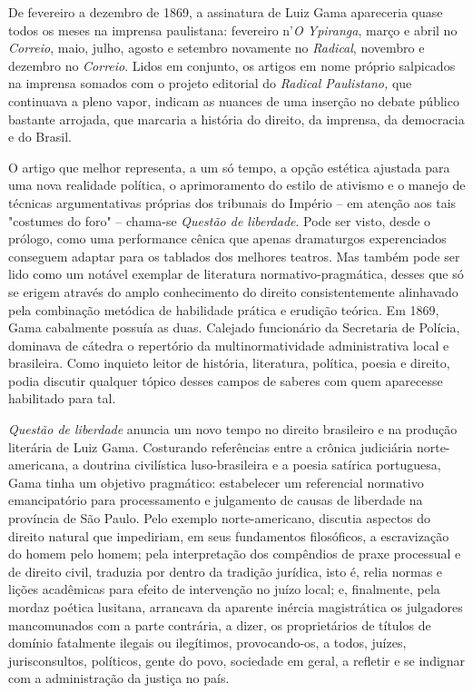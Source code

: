 De fevereiro a dezembro de 1869, a assinatura de Luiz Gama apareceria
quase todos os meses na imprensa paulistana: fevereiro n'\emph{O
Ypiranga}, março e abril no \emph{Correio}, maio, julho, agosto e
setembro novamente no \emph{Radical}, novembro e dezembro no
\emph{Correio}. Lidos em conjunto, os artigos em nome próprio salpicados
na imprensa somados com o projeto editorial do \emph{Radical
Paulistano,} que continuava a pleno vapor, indicam as nuances de uma
inserção no debate público bastante arrojada, que marcaria a história do
direito, da imprensa, da democracia e do Brasil.

O artigo que melhor representa, a um só tempo, a opção estética ajustada
para uma nova realidade política, o aprimoramento do estilo de ativismo
e o manejo de técnicas argumentativas próprias dos tribunais do Império
-- em atenção aos tais "costumes do foro" -- chama-se \emph{Questão de
liberdade}. Pode ser visto, desde o prólogo, como uma performance cênica
que apenas dramaturgos experenciados conseguem adaptar para os tablados
dos melhores teatros. Mas também pode ser lido como um notável exemplar
de literatura normativo-pragmática, desses que só se erigem através do
amplo conhecimento do direito consistentemente alinhavado pela
combinação metódica de habilidade prática e erudição teórica. Em 1869,
Gama cabalmente possuía as duas. Calejado funcionário da Secretaria de
Polícia, dominava de cátedra o repertório da multinormatividade
administrativa local e brasileira. Como inquieto leitor de história,
literatura, política, poesia e direito, podia discutir qualquer tópico
desses campos de saberes com quem aparecesse habilitado para tal.

\emph{Questão de liberdade} anuncia um novo tempo no direito brasileiro
e na produção literária de Luiz Gama. Costurando referências entre a
crônica judiciária norte-americana, a doutrina civilística
luso-brasileira e a poesia satírica portuguesa, Gama tinha um objetivo
pragmático: estabelecer um referencial normativo emancipatório para
processamento e julgamento de causas de liberdade na província de São
Paulo. Pelo exemplo norte-americano, discutia aspectos do direito
natural que impediriam, em seus fundamentos filosóficos, a escravização
do homem pelo homem; pela interpretação dos compêndios de praxe
processual e de direito civil, traduzia por dentro da tradição jurídica,
isto é, relia normas e lições acadêmicas para efeito de intervenção no
juízo local; e, finalmente, pela mordaz poética lusitana, arrancava da
aparente inércia magistrática os julgadores mancomunados com a parte
contrária, a dizer, os proprietários de títulos de domínio fatalmente
ilegais ou ilegítimos, provocando-os, a todos, juízes, jurisconsultos,
políticos, gente do povo, sociedade em geral, a refletir e se indignar
com a administração da justiça no país.

